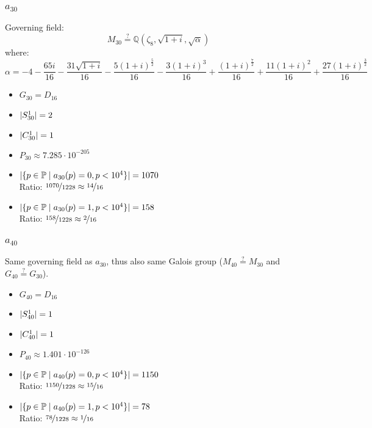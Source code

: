 \subsubsection{$a_{30}$}
Governing field:
$$M_{30} \stackrel{?}{=} \mathbb{Q}\left(\zeta_8, \sqrt{1+i}, \sqrt{\alpha}\right)$$
where:
$$\alpha = -4 - \frac{65 i}{16} - \frac{31 \sqrt{1 + i}}{16} - \frac{5 \left(1 + i\right)^{\frac{5}{2}}}{16} - \frac{3 \left(1 + i\right)^{3}}{16} + \frac{\left(1 + i\right)^{\frac{7}{2}}}{16} + \frac{11 \left(1 + i\right)^{2}}{16} + \frac{27 \left(1 + i\right)^{\frac{3}{2}}}{16}$$
\begin{multicols}{2}
	\begin{itemize}
		\item $G_{30} = D_{16}$
		\item $| S_{30}^1 | = 2$
		\item $| C_{30}^1 | = 1$
		\item $P_{30} \approx 7.285 \cdot 10^{-205}$
	\end{itemize}
	\begin{itemize}
		\item $| \{ p \in \mathbb{P} \mid a_{30}(p)=0, p<10^4 \} | = 1070$\\
		Ratio: $\nicefrac{ 1070 }{ 1228 } \approx \nicefrac{ 14 }{ 16 }$
		\item $| \{ p \in \mathbb{P} \mid a_{30}(p)=1, p<10^4 \} | = 158$\\
		Ratio: $\nicefrac{ 158 }{ 1228 } \approx \nicefrac{ 2 }{ 16 }$
	\end{itemize}
\end{multicols}

\subsubsection{$a_{40}$}
Same governing field as $a_{30}$, thus also same Galois group ($M_{40} \stackrel{?}{=} M_{30}$ and $G_{40} \stackrel{?}{=} G_{30}$).
\begin{multicols}{2}
	\begin{itemize}
		\item $G_{40} = D_{16}$
		\item $| S_{40}^1 | = 1$
		\item $| C_{40}^1 | = 1$
		\item $P_{40} \approx 1.401 \cdot 10^{-126}$
	\end{itemize}
	\begin{itemize}
		\item $| \{ p \in \mathbb{P} \mid a_{40}(p)=0, p<10^4 \} | = 1150$\\
		Ratio: $\nicefrac{ 1150 }{ 1228 } \approx \nicefrac{ 15 }{ 16 }$
		\item $| \{ p \in \mathbb{P} \mid a_{40}(p)=1, p<10^4 \} | = 78$\\
		Ratio: $\nicefrac{ 78 }{ 1228 } \approx \nicefrac{ 1 }{ 16 }$
	\end{itemize}
\end{multicols}

